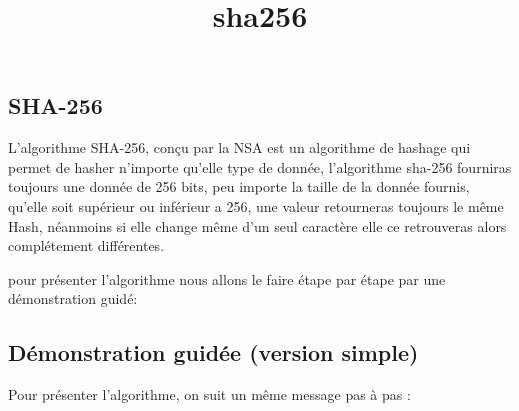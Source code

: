\documentclass[11pt]{article}
\title{sha256}
\begin{document}
    
    \maketitle
    
    

    
    \subsection{SHA-256}\label{sha-256}

L'algorithme SHA-256, conçu par la NSA est un algorithme de hashage qui
permet de hasher n'importe qu'elle type de donnée, l'algorithme sha-256
fourniras toujours une donnée de 256 bits, peu importe la taille de la
donnée fournis, qu'elle soit supérieur ou inférieur a 256, une valeur
retourneras toujours le même Hash, néanmoins si elle change même d'un
seul caractère elle ce retrouveras alors complétement différentes.

pour présenter l'algorithme nous allons le faire étape par étape par une
démonstration guidé:

    \subsection{Démonstration guidée (version
simple)}\label{duxe9monstration-guiduxe9e-version-simple}

Pour présenter l'algorithme, on suit un même message pas à pas :
\end{document}
